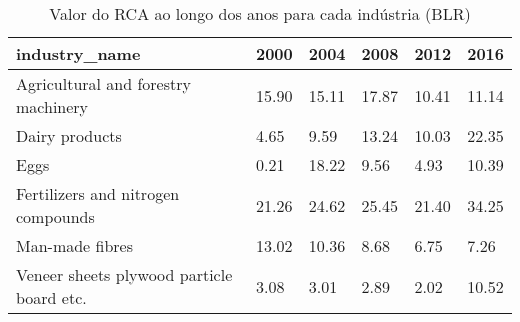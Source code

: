\begin{table}
\centering
\caption{Valor do RCA ao longo dos anos para cada indústria (BLR)}
\begin{tabular}{p{6cm}p{1.5cm}p{1.5cm}p{1.5cm}p{1.5cm}p{1.5cm}}
\toprule
                            industry\_name &  2000 &  2004 &  2008 &  2012 &  2016 \\
\midrule
      Agricultural and forestry machinery & 15.90 & 15.11 & 17.87 & 10.41 & 11.14 \\
                           Dairy products &  4.65 &  9.59 & 13.24 & 10.03 & 22.35 \\
                                     Eggs &  0.21 & 18.22 &  9.56 &  4.93 & 10.39 \\
       Fertilizers and nitrogen compounds & 21.26 & 24.62 & 25.45 & 21.40 & 34.25 \\
                          Man-made fibres & 13.02 & 10.36 &  8.68 &  6.75 &  7.26 \\
Veneer sheets plywood particle board etc. &  3.08 &  3.01 &  2.89 &  2.02 & 10.52 \\
\bottomrule
\end{tabular}
\end{table}
